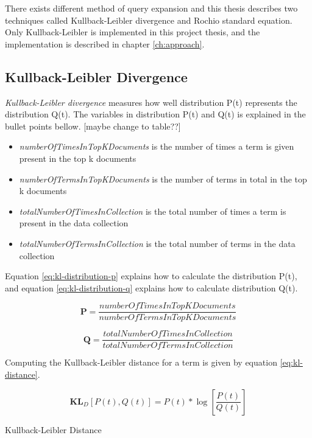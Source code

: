 There exists different method of query expansion and this thesis describes two techniques called Kullback-Leibler divergence and Rochio standard equation.
Only Kullback-Leibler is implemented in this project thesis, and the implementation is described in chapter \ref{ch:approach}.

\subsection{Kullback-Leibler Divergence}
\textit{Kullback-Leibler divergence} measures how well distribution P(t) represents the distribution Q(t).
The variables in distribution P(t) and Q(t) is explained in the bullet points bellow. [maybe change to table??]

\begin{itemize}
	\item \textit{numberOfTimesInTopKDocuments} is the number of times a term is given present in the top k documents
	\item \textit{numberOfTermsInTopKDocuments} is the number of terms in total in the top k documents
	\item \textit{totalNumberOfTimesInCollection} is the total number of times a term is present in the data collection
	\item \textit{totalNumberOfTermsInCollection} is the total number of terms in the data collection
\end{itemize}

Equation \ref{eq:kl-distribution-p} explains how to calculate the distribution P(t),
and equation \ref{eq:kl-distribution-q} explains how to calculate distribution Q(t).

\begin{cequation}[H]
	\begin{equation}
		\mathbf{P} = \frac{numberOfTimesInTopKDocuments}{numberOfTermsInTopKDocuments}
	\end{equation}
  \label{eq:kl-distribution-p}
\end{cequation}

\begin{cequation}[H]
	\begin{equation}
		\mathbf{Q} = \frac{totalNumberOfTimesInCollection}{totalNumberOfTermsInCollection}
	\end{equation}
  \label{eq:kl-distribution-q}
\end{cequation}

Computing the Kullback-Leibler distance for a term is given by equation \ref{eq:kl-distance}.

\begin{cequation}[H]
	\begin{equation}
		\mathbf{KL}_D[P(t), Q(t)] = P(t)*\log{[\frac{P(t)}{Q(t)}]}
	\end{equation}
	\caption{Kullback-Leibler Distance}
  \label{eq:kl-distance}
\end{cequation}
